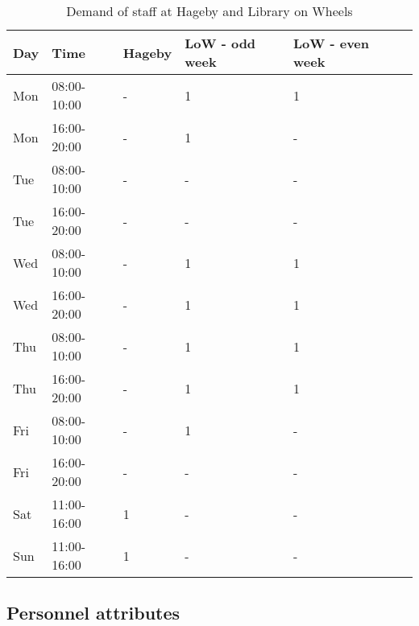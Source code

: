 \begin{table}[h]
\centering
\caption{Demand of staff at Hageby and Library on Wheels}
\label{tab:Hageby_LOW_Demand}
\begin{tabularx}{\textwidth}{|X|l|l|l|l|X|}
\hline
\textbf{Day} & \textbf{Time} & \textbf{Hageby}& \textbf{LoW - odd week} & \textbf{LoW - even week} 
\\ \hline 
\rowcolor{Gray} 
Mon & 08:00-10:00 & - & 1 & 1
\\ \hline 
\rowcolor{Gray}  
Mon & 16:00-20:00 & - & 1 & -
\\ \hline 
Tue & 08:00-10:00 & - & - & -
\\ \hline 
Tue & 16:00-20:00 & - & - & -
\\ \hline 
\rowcolor{Gray} 
Wed & 08:00-10:00 & - & 1 & 1
\\ \hline 
\rowcolor{Gray} 
Wed & 16:00-20:00 & - & 1 & 1
\\ \hline 
Thu & 08:00-10:00 & - & 1 & 1
\\ \hline 
Thu & 16:00-20:00 & - & 1 & 1
\\ \hline 
\rowcolor{Gray}
Fri & 08:00-10:00 & - & 1 & -
\\ \hline 
\rowcolor{Gray}
Fri & 16:00-20:00 & - & - & -
\\ \hline 
Sat & 11:00-16:00  & 1 & - & -
\\ \hline 
Sun & 11:00-16:00  & 1 & - & -
\\ \hline 
\end{tabularx}
\end{table} 

\subsection{Personnel attributes}

